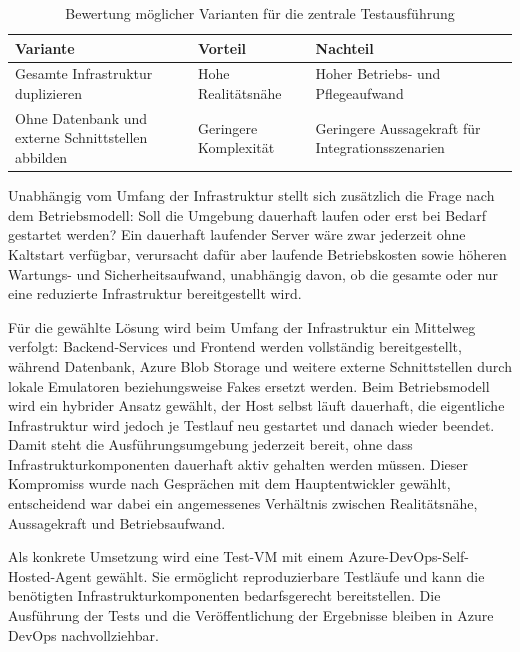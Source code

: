 \begin{table}[H]
    \centering
    \caption{Bewertung möglicher Varianten für die zentrale Testausführung}
    \label{tab:zentrale-varianten}
    \renewcommand{\arraystretch}{1.3}
    \begin{tabularx}{\textwidth}{@{}p{}XX@{}}
        \toprule
        \textbf{Variante} & \textbf{Vorteil} & \textbf{Nachteil} \\
        \midrule
        Gesamte Infrastruktur duplizieren & Hohe Realitätsnähe & Hoher Betriebs- und Pflegeaufwand \\
        \addlinespace
        Ohne Datenbank und externe Schnittstellen abbilden & Geringere Komplexität & Geringere Aussagekraft für Integrationsszenarien \\
        \bottomrule
    \end{tabularx}
\end{table}

Unabhängig vom Umfang der Infrastruktur stellt sich zusätzlich die Frage nach dem Betriebsmodell: Soll die Umgebung dauerhaft laufen oder erst bei Bedarf gestartet werden? Ein dauerhaft laufender Server wäre zwar jederzeit ohne Kaltstart verfügbar, verursacht dafür aber laufende Betriebskosten sowie höheren Wartungs- und Sicherheitsaufwand, unabhängig davon, ob die gesamte oder nur eine reduzierte Infrastruktur bereitgestellt wird.

Für die gewählte Lösung wird beim Umfang der Infrastruktur ein Mittelweg verfolgt: Backend-Services und Frontend werden vollständig bereitgestellt, während Datenbank, Azure Blob Storage und weitere externe Schnittstellen durch lokale Emulatoren beziehungsweise Fakes ersetzt werden. Beim Betriebsmodell wird ein hybrider Ansatz gewählt, der Host selbst läuft dauerhaft, die eigentliche Infrastruktur wird jedoch je Testlauf neu gestartet und danach wieder beendet. Damit steht die Ausführungsumgebung jederzeit bereit, ohne dass Infrastrukturkomponenten dauerhaft aktiv gehalten werden müssen. Dieser Kompromiss wurde nach Gesprächen mit dem Hauptentwickler gewählt, entscheidend war dabei ein angemessenes Verhältnis zwischen Realitätsnähe, Aussagekraft und Betriebsaufwand.

Als konkrete Umsetzung wird eine Test-VM mit einem Azure-DevOps-Self-Hosted-Agent gewählt. Sie ermöglicht reproduzierbare Testläufe und kann die benötigten Infrastrukturkomponenten bedarfsgerecht bereitstellen. Die Ausführung der Tests und die Veröffentlichung der Ergebnisse bleiben in Azure DevOps nachvollziehbar.

